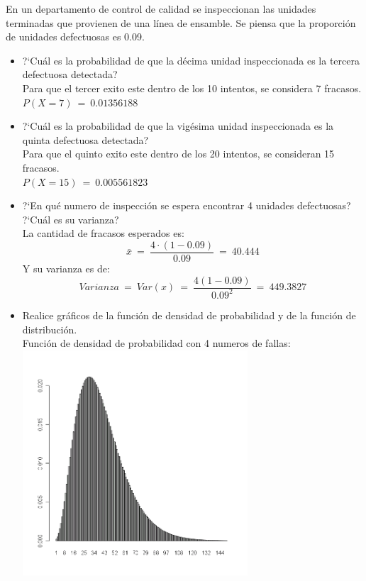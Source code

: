 %
%
En un departamento de control de calidad se inspeccionan las unidades terminadas que provienen de una l\'inea de ensamble.
Se piensa que la proporci\'on de unidades defectuosas es 0.09.
\begin{itemize}
	\item ?`Cu\'al es la probabilidad de que la d\'ecima unidad inspeccionada es la tercera defectuosa detectada?\\
		Para que el tercer exito este dentro de los 10 intentos, se considera 7 fracasos.\\
		$P(X=7)\ =\ 0.01356188$\\ %
	\item ?`Cu\'al es la probabilidad de que la vig\'esima unidad inspeccionada es la quinta defectuosa detectada?\\
		Para que el quinto exito este dentro de los 20 intentos, se consideran 15 fracasos.\\
		$P(X=15)\ =\ 0.005561823$\\%
	\item ?`En qu\'e numero de inspecci\'on se espera encontrar 4 unidades defectuosas? ?`Cu\'al es su varianza?\\
		La cantidad de fracasos esperados es:
		$$ \bar{x}\ =\ \frac{4\cdot(1-0.09)}{0.09}\ =\ 40.444 $$
		Y su varianza es de:
		 $$Varianza\ =\ Var(x)\ =\ \frac{4(1-0.09)}{0.09^2}\ =\ 449.3827 $$
	\item Realice gr\'aficos de la funci\'on de densidad de probabilidad y de la funci\'on de distribuci\'on.\\
	Funci\'on de densidad de probabilidad con 4 numeros de fallas:\\
  	  \includegraphics[width=3.3in,height=3.3in]{images/1_3-dnbinom.png}\\

\end{itemize}

